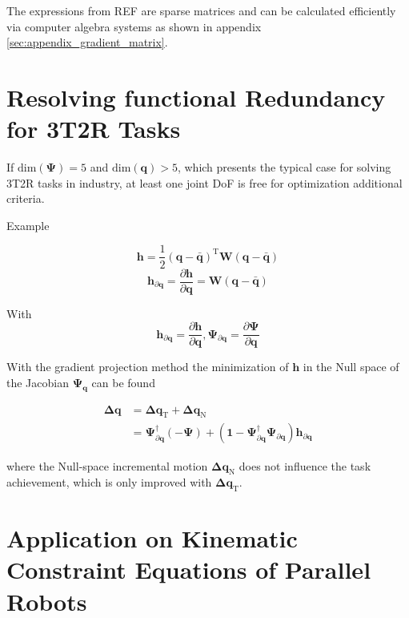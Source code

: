 \documentclass[twocolumn,10pt]{IFTOMM}
\newcommand{\bm}[1]{\boldsymbol{#1}}
\newcommand{\transp}[0]{{\mathrm{T}}}
\begin{document}
The expressions from REF are sparse matrices and can be calculated efficiently via computer algebra systems as shown in appendix \ref{sec:appendix_gradient_matrix}.


\section{Resolving functional Redundancy for 3T2R Tasks}
\label{sec:ResFuncRed}


If $\mathrm{dim}(\bm{\Psi})=5$ and $\mathrm{dim}(\bm{q})>5$, which presents the typical case for solving 3T2R tasks in industry, at least one joint DoF is free for optimization additional criteria.

Example

\begin{equation}
\bm{h}
=
\frac{1}{2} (\bm{q}-\bar{\bm{q}})^\transp\bm{W}(\bm{q}-\bar{\bm{q}})
\end{equation}  
%
\begin{equation}
\bm{h}_{\partial\bm{q}}
=
\frac{\partial \bm{h}}{\partial \bm{q}}
=
\bm{W}(\bm{q}-\bar{\bm{q}})
\end{equation}

With
\begin{equation}
\bm{h}_{\partial\bm{q}}=\frac{\partial \bm{h}}{\partial \bm{q}},
\bm{\Psi}_{\partial\bm{q}}=\frac{\partial \bm{\Psi}}{\partial \bm{q}}
\end{equation}


With the gradient projection method the minimization of $\bm{h}$ in the Null space of the Jacobian $\bm{\Psi}_{\bm{q}}$ can be found

\begin{align}
\bm{\Delta}\bm{q}
&=
\bm{\Delta}\bm{q}_{\mathrm{T}} + \bm{\Delta}\bm{q}_{\mathrm{N}} \\
&=
\bm{\Psi}_{\partial\bm{q}}^{\dagger} (-\bm{\Psi}) + (\bm{1}-\bm{\Psi}_{\partial\bm{q}}^{\dagger}\bm{\Psi}_{\partial\bm{q}}) \bm{h}_{\partial\bm{q}}
\end{align}

where the Null-space incremental motion $\bm{\Delta}\bm{q}_{\mathrm{N}}$ does not influence the task achievement, which is only improved with $\bm{\Delta}\bm{q}_{\mathrm{T}}$.

\section{Application on Kinematic Constraint Equations of Parallel Robots}
\label{sec:ParRobKinConstr}
\end{document}
